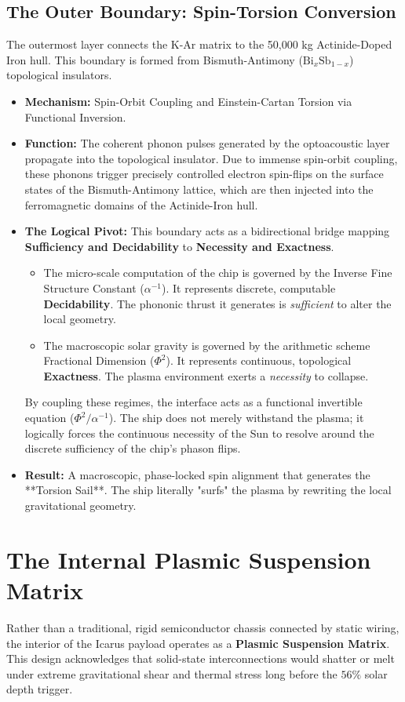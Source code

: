 \subsection[The Outer Boundary]{The Outer Boundary: Spin-Torsion Conversion}
The outermost layer connects the K-Ar matrix to the 50,000 kg Actinide-Doped Iron hull. This boundary is formed from Bismuth-Antimony ($\text{Bi}_x\text{Sb}_{1-x}$) topological insulators.
\begin{itemize}
    \item \textbf{Mechanism:} Spin-Orbit Coupling and Einstein-Cartan Torsion via Functional Inversion.
    \item \textbf{Function:} The coherent phonon pulses generated by the optoacoustic layer propagate into the topological insulator. Due to immense spin-orbit coupling, these phonons trigger precisely controlled electron spin-flips on the surface states of the Bismuth-Antimony lattice, which are then injected into the ferromagnetic domains of the Actinide-Iron hull. 
    \item \textbf{The Logical Pivot:} This boundary acts as a bidirectional bridge mapping \textbf{Sufficiency and Decidability} to \textbf{Necessity and Exactness}. 
    \begin{itemize}
        \item The micro-scale computation of the chip is governed by the Inverse Fine Structure Constant ($\alpha^{-1}$). It represents discrete, computable \textbf{Decidability}. The phononic thrust it generates is \emph{sufficient} to alter the local geometry.
        \item The macroscopic solar gravity is governed by the arithmetic scheme Fractional Dimension ($\Phi^2$). It represents continuous, topological \textbf{Exactness}. The plasma environment exerts a \emph{necessity} to collapse.
    \end{itemize}
    By coupling these regimes, the interface acts as a functional invertible equation ($\Phi^2 / \alpha^{-1}$). The ship does not merely withstand the plasma; it logically forces the continuous necessity of the Sun to resolve around the discrete sufficiency of the chip's phason flips.
    \item \textbf{Result:} A macroscopic, phase-locked spin alignment that generates the **Torsion Sail**. The ship literally "surfs" the plasma by rewriting the local gravitational geometry.
\end{itemize}

\section[The Internal Plasmic Suspension]{The Internal Plasmic Suspension Matrix}
Rather than a traditional, rigid semiconductor chassis connected by static wiring, the interior of the Icarus payload operates as a \textbf{Plasmic Suspension Matrix}. This design acknowledges that solid-state interconnections would shatter or melt under extreme gravitational shear and thermal stress long before the $56\%$ solar depth trigger.

